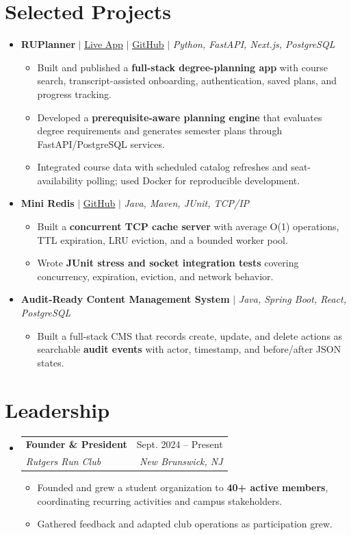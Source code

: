 \documentclass[letterpaper,10pt]{article}
\makeatletter
\newcommand{\resumeItem}[1]{\item\small{#1}}
\newcommand{\resumeSubheading}[4]{
  \vspace{1pt}\item
  \begin{tabular*}{0.97\textwidth}[t]{l@{\extracolsep{\fill}}r}
    \textbf{#1} & #2 \\
    \textit{\small #3} & \textit{\small #4} \\
  \end{tabular*}\vspace{-3pt}
}
\newcommand{\resumeProjectHeading}[1]{\vspace{3pt}\item\small{#1}\vspace{0pt}}
\newcommand{\resumeSubHeadingListStart}{\begin{itemize}[leftmargin=0.15in,label={},itemsep=0pt,topsep=0pt]}
\newcommand{\resumeSubHeadingListEnd}{\end{itemize}}
\newcommand{\resumeItemListStart}{\begin{itemize}[leftmargin=0.15in,label=\textbullet,itemsep=-2pt,topsep=0pt]}
\newcommand{\resumeItemListEnd}{\end{itemize}\vspace{0pt}}
\makeatother
\begin{document}
\section{Selected Projects}
\resumeSubHeadingListStart
  \resumeProjectHeading{\textbf{RUPlanner} $|$ \href{https://ruplanner.app/}{\underline{Live App}} $|$ \href{https://github.com/ameer-rah/RUPlanner}{\underline{GitHub}} $|$ \emph{Python, FastAPI, Next.js, PostgreSQL}}
    \resumeItemListStart
      \resumeItem{Built and published a \textbf{full-stack degree-planning app} with course search, transcript-assisted onboarding, authentication, saved plans, and progress tracking.}
      \resumeItem{Developed a \textbf{prerequisite-aware planning engine} that evaluates degree requirements and generates semester plans through FastAPI/PostgreSQL services.}
      \resumeItem{Integrated course data with scheduled catalog refreshes and seat-availability polling; used Docker for reproducible development.}
    \resumeItemListEnd
  \resumeProjectHeading{\textbf{Mini Redis} $|$ \href{https://github.com/ameer-rah/mini-redis}{\underline{GitHub}} $|$ \emph{Java, Maven, JUnit, TCP/IP}}
    \resumeItemListStart
      \resumeItem{Built a \textbf{concurrent TCP cache server} with average O(1) operations, TTL expiration, LRU eviction, and a bounded worker pool.}
      \resumeItem{Wrote \textbf{JUnit stress and socket integration tests} covering concurrency, expiration, eviction, and network behavior.}
    \resumeItemListEnd
  \resumeProjectHeading{\textbf{Audit-Ready Content Management System} $|$ \emph{Java, Spring Boot, React, PostgreSQL}}
    \resumeItemListStart
      \resumeItem{Built a full-stack CMS that records create, update, and delete actions as searchable \textbf{audit events} with actor, timestamp, and before/after JSON states.}
    \resumeItemListEnd
\resumeSubHeadingListEnd

\section{Leadership}
\resumeSubHeadingListStart
  \resumeSubheading{Founder \& President}{Sept. 2024 -- Present}
    {Rutgers Run Club}{New Brunswick, NJ}
    \resumeItemListStart
      \resumeItem{Founded and grew a student organization to \textbf{40+ active members}, coordinating recurring activities and campus stakeholders.}
      \resumeItem{Gathered feedback and adapted club operations as participation grew.}
    \resumeItemListEnd
\resumeSubHeadingListEnd
\end{document}
